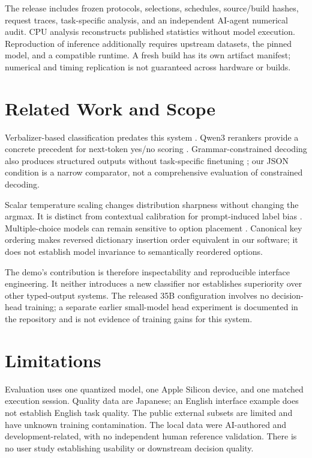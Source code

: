 \documentclass[11pt]{article}
\begin{document}
The release includes frozen protocols, selections, schedules, source/build hashes, request traces, task-specific analysis, and an independent AI-agent numerical audit. CPU analysis reconstructs published statistics without model execution. Reproduction of inference additionally requires upstream datasets, the pinned model, and a compatible runtime. A fresh build has its own artifact manifest; numerical and timing replication is not guaranteed across hardware or builds.

\section{Related Work and Scope}
Verbalizer-based classification predates this system \citep{schick2021pet}. Qwen3 rerankers provide a concrete precedent for next-token yes/no scoring \citep{zhang2025qwen3embedding,qwen3reranker}. Grammar-constrained decoding also produces structured outputs without task-specific finetuning \citep{geng2023grammar}; our JSON condition is a narrow comparator, not a comprehensive evaluation of constrained decoding.

Scalar temperature scaling \citep{guo2017calibration} changes distribution sharpness without changing the argmax. It is distinct from contextual calibration for prompt-induced label bias \citep{zhao2021calibrate}. Multiple-choice models can remain sensitive to option placement \citep{zheng2024selectors}. Canonical key ordering makes reversed dictionary insertion order equivalent in our software; it does not establish model invariance to semantically reordered options.

The demo's contribution is therefore inspectability and reproducible interface engineering. It neither introduces a new classifier nor establishes superiority over other typed-output systems. The released 35B configuration involves no decision-head training; a separate earlier small-model head experiment is documented in the repository and is not evidence of training gains for this system.

\section*{Limitations}
Evaluation uses one quantized model, one Apple Silicon device, and one matched execution session. Quality data are Japanese; an English interface example does not establish English task quality. The public external subsets are limited and have unknown training contamination. The local data were AI-authored and development-related, with no independent human reference validation. There is no user study establishing usability or downstream decision quality.
\end{document}
